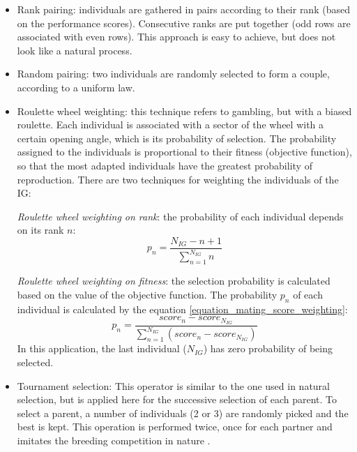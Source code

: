 \documentclass{ametsoc}
\begin{document}
\begin{itemize}
	\item Rank pairing: individuals are gathered in pairs according to their rank (based on the performance scores). Consecutive ranks are put together (odd rows are associated with even rows). This approach is easy to achieve, but does not look like a natural process.
	
	\item Random pairing: two individuals are randomly selected to form a couple, according to a uniform law.
	
	\item Roulette wheel weighting: this technique refers to gambling, but with a biased roulette. Each individual is associated with a sector of the wheel with a certain opening angle, which is its probability of selection. The probability assigned to the individuals is proportional to their fitness (objective function), so that the most adapted individuals have the greatest probability of reproduction. There are two techniques for weighting the individuals of the IG:
	
	\textit{Roulette wheel weighting on rank}: the probability of each individual depends on its rank $n$:
	\begin{equation}
	p_{n}=\dfrac{N_{IG}-n+1}{\sum^{N_{IG}}_{n=1}n}
	\label{equation_mating_rank_weighting}
	\end{equation}
	
	\textit{Roulette wheel weighting on fitness}: the selection probability is calculated based on the value of the objective function. The probability $p_{n}$ of each individual is calculated by the equation \ref{equation_mating_score_weighting}:
	\begin{equation}
	p_{n}=\frac{score_{n}-score_{N_{IG}}}{\sum_{n=1}^{N_{IG}} (score_{n}-score_{N_{IG}})}
	\label{equation_mating_score_weighting}
	\end{equation}
	In this application, the last individual ($N_{IG}$) has zero probability of being selected.
	
	
	\item Tournament selection: This operator is similar to the one used in natural selection, but is applied here for the successive selection of each parent. To select a parent, a number of individuals (2 or 3) are randomly picked and the best is kept. This operation is performed twice, once for each partner and imitates the breeding competition in nature \citep{Haupt2004}.
\end{itemize}
\end{document}
